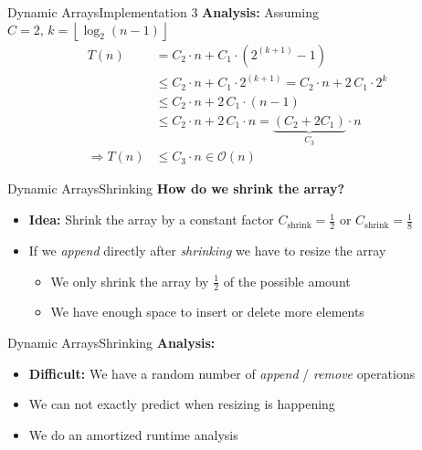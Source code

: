 
\begin{frame}{Dynamic Arrays}{Implementation 3}
  \textbf{Analysis:}
  Assuming $C = 2, \, k = \left\lfloor\log_2(n-1)\right\rfloor$
  \begin{align*}
    T(n) &= C_2 \cdot n + C_1 \cdot (2^{(k+1)}-1)\\
    {} &\leq C_2 \cdot n + C_1 \cdot 2^{(k+1)}
      = C_2 \cdot n + 2 \, C_1 \cdot 2^{k}\\
    {} &\leq C_2 \cdot n + 2 \, C_1 \cdot (n - 1)\\
    {} &\leq C_2 \cdot n + 2 \, C_1 \cdot n
      = \underbrace{(C_2 + 2 C_1)}_{C_3} \cdot n\\
    \Rightarrow T(n) &\leq C_3 \cdot n \in \mathcal{O}(n)
  \end{align*}
\end{frame}


\begin{frame}{Dynamic Arrays}{Shrinking}
  \textbf{How do we shrink the array?}
  \begin{itemize}
    \item
      \textbf{Idea:}
      Shrink the array by a constant factor
      $C_\text{shrink} = \frac{1}{2}$ or $C_\text{shrink} = \frac{1}{8}$
    \item
      If we \textit{append} directly after \textit{shrinking} we have to
      resize the array
      \begin{itemize}
        \item
          We only shrink the array by $\frac{1}{2}$ of the possible amount
        \item
          We have enough space to insert or delete more elements
       \end{itemize}
  \end{itemize}
\end{frame}


\begin{frame}{Dynamic Arrays}{Shrinking}
  \textbf{Analysis:}
  \begin{itemize}
    \item
      \textbf{Difficult:}
      We have a random number of \textit{append} / \textit{remove} operations
    \item
      We can not exactly predict when resizing is happening
    \item
      We do an amortized runtime analysis \cite{wikipedia_amortized_analysis}
  \end{itemize}
\end{frame}
